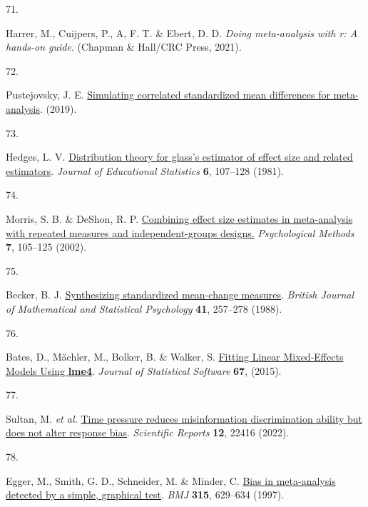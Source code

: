 \documentclass[
  doc,floatsintext]{apa6}
\newlength{\cslhangindent}
\newlength{\csllabelwidth}
\newenvironment{CSLReferences}[2] %
 {\begin{list}{}{%
  \setlength{\itemindent}{0pt}
  \setlength{\leftmargin}{0pt}
  \setlength{\parsep}{0pt}
  \ifodd #1
   \setlength{\leftmargin}{\cslhangindent}
   \setlength{\itemindent}{-1\cslhangindent}
  \fi
  \setlength{\itemsep}{#2\baselineskip}}}
 {\end{list}}
\newcommand{\CSLLeftMargin}[1]{\parbox[t]{\csllabelwidth}{\strut#1\strut}}
\newcommand{\CSLRightInline}[1]{\parbox[t]{\linewidth - \csllabelwidth}{\strut#1\strut}}
\begin{document}
\begin{CSLReferences}{0}{0}
\CSLLeftMargin{71. }%
\CSLRightInline{Harrer, M., Cuijpers, P., A, F. T. \& Ebert, D. D. \emph{Doing meta-analysis with r: A hands-on guide}. (Chapman \& Hall/CRC Press, 2021).}

\CSLLeftMargin{72. }%
\CSLRightInline{Pustejovsky, J. E. \href{https://www.jepusto.com/simulating-correlated-smds/}{Simulating correlated standardized mean differences for meta-analysis}. (2019).}

\CSLLeftMargin{73. }%
\CSLRightInline{Hedges, L. V. \href{https://doi.org/10.3102/10769986006002107}{Distribution theory for glass's estimator of effect size and related estimators}. \emph{Journal of Educational Statistics} \textbf{6}, 107--128 (1981).}

\CSLLeftMargin{74. }%
\CSLRightInline{Morris, S. B. \& DeShon, R. P. \href{https://doi.org/10.1037/1082-989X.7.1.105}{Combining effect size estimates in meta-analysis with repeated measures and independent-groups designs.} \emph{Psychological Methods} \textbf{7}, 105--125 (2002).}

\CSLLeftMargin{75. }%
\CSLRightInline{Becker, B. J. \href{https://doi.org/10.1111/j.2044-8317.1988.tb00901.x}{Synthesizing standardized mean-change measures}. \emph{British Journal of Mathematical and Statistical Psychology} \textbf{41}, 257--278 (1988).}

\CSLLeftMargin{76. }%
\CSLRightInline{Bates, D., Mächler, M., Bolker, B. \& Walker, S. \href{https://doi.org/10.18637/jss.v067.i01}{Fitting Linear Mixed-Effects Models Using {\textbf{lme4}}}. \emph{Journal of Statistical Software} \textbf{67}, (2015).}

\CSLLeftMargin{77. }%
\CSLRightInline{*Sultan, M. \emph{et al.} \href{https://doi.org/10.1038/s41598-022-26209-8}{Time pressure reduces misinformation discrimination ability but does not alter response bias}. \emph{Scientific Reports} \textbf{12}, 22416 (2022).}

\CSLLeftMargin{78. }%
\CSLRightInline{Egger, M., Smith, G. D., Schneider, M. \& Minder, C. \href{https://doi.org/10.1136/bmj.315.7109.629}{Bias in meta-analysis detected by a simple, graphical test}. \emph{BMJ} \textbf{315}, 629--634 (1997).}


\end{CSLReferences}
\end{document}
